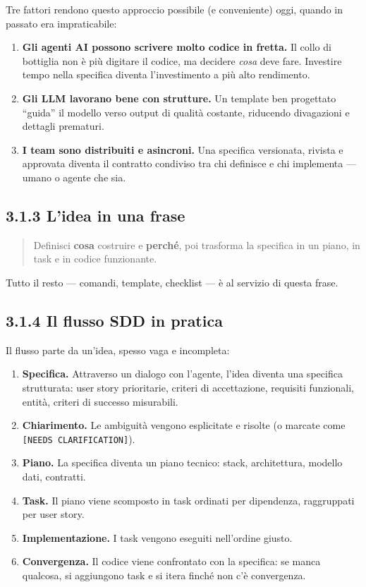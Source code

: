 \documentclass[
  italian,
  10pt,
]{book}
\providecommand{\tightlist}{%
  \setlength{\itemsep}{0pt}\setlength{\parskip}{0pt}}
\begin{document}
Tre fattori rendono questo approccio possibile (e conveniente) oggi,
quando in passato era impraticabile:

\begin{enumerate}
\def\labelenumi{\arabic{enumi}.}
\tightlist
\item
  \textbf{Gli agenti AI possono scrivere molto codice in fretta.} Il
  collo di bottiglia non è più digitare il codice, ma decidere
  \emph{cosa} deve fare. Investire tempo nella specifica diventa
  l'investimento a più alto rendimento.
\item
  \textbf{Gli LLM lavorano bene con strutture.} Un template ben
  progettato ``guida'' il modello verso output di qualità costante,
  riducendo divagazioni e dettagli prematuri.
\item
  \textbf{I team sono distribuiti e asincroni.} Una specifica
  versionata, rivista e approvata diventa il contratto condiviso tra chi
  definisce e chi implementa --- umano o agente che sia.
\end{enumerate}

\subsection{3.1.3 L'idea in una frase}\label{lidea-in-una-frase}

\begin{quote}
Definisci \textbf{cosa} costruire e \textbf{perché}, poi trasforma la
specifica in un piano, in task e in codice funzionante.
\end{quote}

Tutto il resto --- comandi, template, checklist --- è al servizio di
questa frase.

\subsection{3.1.4 Il flusso SDD in
pratica}\label{il-flusso-sdd-in-pratica}

Il flusso parte da un'idea, spesso vaga e incompleta:

\begin{enumerate}
\def\labelenumi{\arabic{enumi}.}
\tightlist
\item
  \textbf{Specifica.} Attraverso un dialogo con l'agente, l'idea diventa
  una specifica strutturata: user story prioritarie, criteri di
  accettazione, requisiti funzionali, entità, criteri di successo
  misurabili.
\item
  \textbf{Chiarimento.} Le ambiguità vengono esplicitate e risolte (o
  marcate come \texttt{{[}NEEDS\ CLARIFICATION{]}}).
\item
  \textbf{Piano.} La specifica diventa un piano tecnico: stack,
  architettura, modello dati, contratti.
\item
  \textbf{Task.} Il piano viene scomposto in task ordinati per
  dipendenza, raggruppati per user story.
\item
  \textbf{Implementazione.} I task vengono eseguiti nell'ordine giusto.
\item
  \textbf{Convergenza.} Il codice viene confrontato con la specifica: se
  manca qualcosa, si aggiungono task e si itera finché non c'è
  convergenza.
\end{enumerate}
\end{document}
